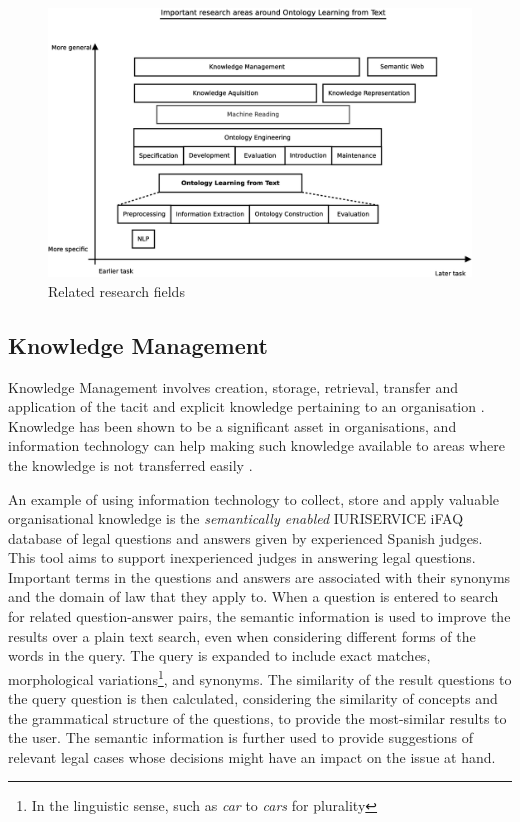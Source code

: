 \documentclass[a4paper]{report}
\begin{document}
\begin{figure}
  \includegraphics[width=\textwidth]{graphics/related-research-fields.eps}
  \caption{Related research fields}
  \label{fig:related-research}
\end{figure}



\subsection{Knowledge Management}

Knowledge Management involves creation, storage, retrieval, transfer and application of the tacit and explicit knowledge pertaining to an organisation \citep{AlaviLeidner2001KM}.
Knowledge has been shown to be a significant asset in organisations, and information technology can help making such knowledge available to areas where the knowledge is not transferred easily \citep{AlaviLeidner2001KM}.

An example of using information technology to collect, store and apply valuable organisational knowledge is the \emph{semantically enabled} IURISERVICE iFAQ database of legal questions and answers given by experienced Spanish judges.
This tool aims to support inexperienced judges in answering legal questions\cite{IURISERVICEPerformance2007}.
Important terms in the questions and answers are associated with their synonyms and the domain of law that they apply to.
When a question is entered to search for related question-answer pairs, the semantic information is used to improve the results over a plain text search, even when considering different forms of the words in the query.
The query is expanded to include exact matches, morphological variations\footnote{In the linguistic sense, such as \emph{car} to \emph{cars} for plurality}, and synonyms.
The similarity of the result questions to the query question is then calculated, considering the similarity of concepts and the grammatical structure of the questions, to provide the most-similar results to the user.
The semantic information is further used to provide suggestions of relevant legal cases whose decisions might have an impact on the issue at hand.
\end{document}
